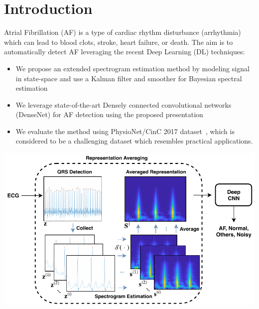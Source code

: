 \documentclass[portrait,a0,final]{a0poster} %
\begin{document}

\vspace{0.04\linewidth}

\centering



\small %


\begin{minipage}{0.98\linewidth}




\begin{minipage}[t]{0.47\linewidth}
\setlength{\parindent}{10mm} %


\section{Introduction}
\Large
Atrial Fibrillation (AF) is a type of cardiac rhythm disturbance (arrhythmia) which can lead to blood clots, stroke, heart failure, or death. The aim is to automatically detect AF leveraging the recent Deep Learning (DL) techniques:
\vspace{10mm}
\begin{itemize}
	\item We propose an extended spectrogram estimation method by modeling signal in state-space and use a Kalman filter and smoother for Bayesian spectral estimation
	\item We leverage state-of-the-art Densely connected convolutional networks (DenseNet) \cite{huang2017densely} for AF detection using the proposed presentation
	\item We evaluate the method using PhysioNet/CinC 2017 dataset~\cite{clifford2017af}, which is considered to be a challenging dataset which resembles practical applications.
\end{itemize}
\begin{minipage}[c]{\linewidth}
	\centering
	\includegraphics[scale=2]{figures/pre-processing}
\end{minipage}



\end{minipage}
\end{minipage}
\end{document}
